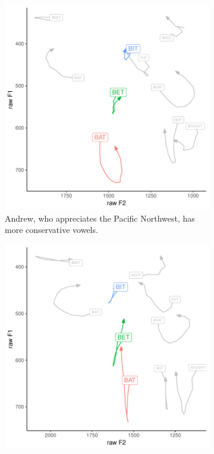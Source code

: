 \begin{figure}[tb!]
    \centering
    \hspace{\fill}
    \begin{subfigure}[t]{2.925in}
        \centering
        \includegraphics[width = \textwidth]{Figures/example_plots/15-Andrew_avg_traj.pdf}
        \caption{Andrew, who appreciates the Pacific Northwest, has more conservative vowels.}
        \label{fig:avg_traj_andrew}
    \end{subfigure}
    \hspace{\fill}
    \begin{subfigure}[t]{2.925in}
        \centering
        \includegraphics[width = \textwidth]{Figures/example_plots/47-Sean_avg_traj.pdf}

\end{subfigure}
\end{figure}
